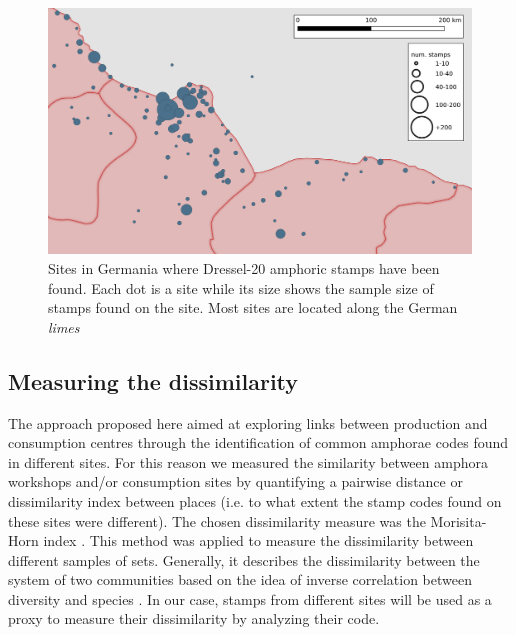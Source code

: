 \documentclass[review]{elsarticle}
\newcommand{\memo}[2]{\textcolor{#1}{#2}}
\newcommand{\xavi}[1]{\memo{magenta}{XRC: #1\\}}
\begin{document}
\begin{figure}[htp]
	\centering
\includegraphics[width=\linewidth]{figs/germania}
\caption{Sites in Germania where Dressel-20 amphoric stamps have been found. Each dot is a site while its size shows the sample size of stamps found on the site. Most sites are located along the German \textit{limes}}
\label{germania}
\end{figure}


\subsection{Measuring the dissimilarity}



The approach proposed here aimed at exploring links between production and consumption centres through the identification of common amphorae codes found in different sites. For this reason we measured the similarity between amphora workshops and/or consumption sites by quantifying a pairwise distance or dissimilarity index between places (i.e. to what extent the stamp codes found on these sites were different). The chosen dissimilarity measure was the Morisita-Horn index \citep{morisita_measuring_1959, horn_measurement_1966}. This method was applied to measure the dissimilarity between different samples of sets. Generally, it describes the dissimilarity between the system of two communities based on the idea of inverse correlation between diversity and species \citep{magurran_why_1988}. In our case, stamps from different sites will be used as a proxy to measure their dissimilarity by analyzing their code. 
\end{document}
